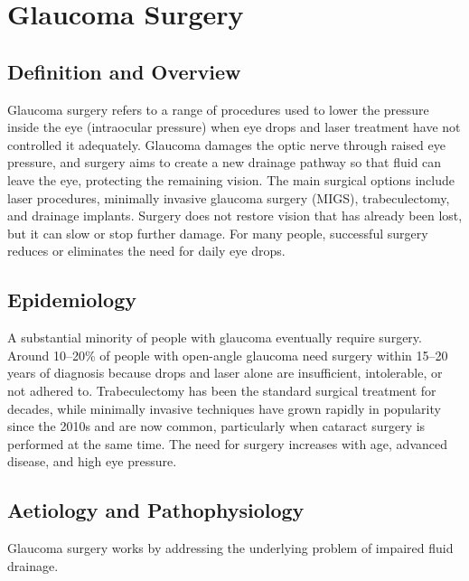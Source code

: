 \chapter{Glaucoma Surgery}

\section*{Definition and Overview}
Glaucoma surgery refers to a range of procedures used to lower the pressure inside the eye (intraocular pressure) when eye drops and laser treatment have not controlled it adequately. Glaucoma damages the optic nerve through raised eye pressure, and surgery aims to create a new drainage pathway so that fluid can leave the eye, protecting the remaining vision. The main surgical options include laser procedures, minimally invasive glaucoma surgery (MIGS), trabeculectomy, and drainage implants. Surgery does not restore vision that has already been lost, but it can slow or stop further damage. For many people, successful surgery reduces or eliminates the need for daily eye drops.

\section*{Epidemiology}
A substantial minority of people with glaucoma eventually require surgery. Around 10--20\% of people with open-angle glaucoma need surgery within 15--20 years of diagnosis because drops and laser alone are insufficient, intolerable, or not adhered to. Trabeculectomy has been the standard surgical treatment for decades, while minimally invasive techniques have grown rapidly in popularity since the 2010s and are now common, particularly when cataract surgery is performed at the same time. The need for surgery increases with age, advanced disease, and high eye pressure.

\section*{Aetiology and Pathophysiology}
Glaucoma surgery works by addressing the underlying problem of impaired fluid drainage.

